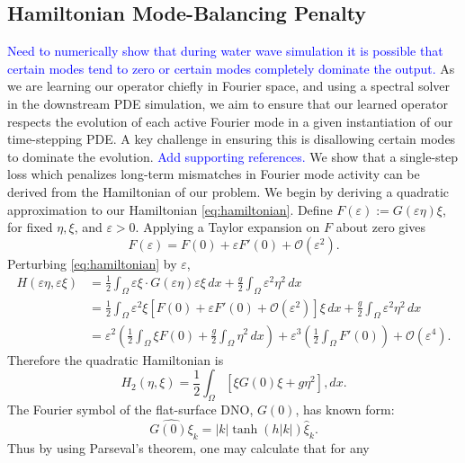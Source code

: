 \documentclass{article}
\begin{document}
\subsection{Hamiltonian Mode-Balancing Penalty}
\textcolor{blue}{Need to numerically show that during water wave simulation
it is possible that certain modes tend to zero or certain modes completely
dominate the output.}
As we are learning our operator chiefly in Fourier space, and using a
spectral solver in the downstream PDE simulation, we aim to ensure that
our learned operator respects the evolution of each active Fourier mode in
a given instantiation of our time-stepping PDE. A key challenge in ensuring
this is disallowing certain modes to dominate the evolution.
\textcolor{blue}{Add supporting references.}
We show that a single-step loss which penalizes long-term mismatches in
Fourier mode activity can be derived from the Hamiltonian of our problem.
We begin by deriving a quadratic approximation to our Hamiltonian
\eqref{eq:hamiltonian}. Define $F(\varepsilon):=G(\varepsilon\eta)\xi$,
for fixed $\eta,\xi$, and $\varepsilon>0$. Applying a Taylor expansion on
$F$ about zero gives
\begin{equation}
    F(\varepsilon)=F(0)+\varepsilon F'(0)+\mathcal O(\varepsilon^2).
\end{equation}
Perturbing \eqref{eq:hamiltonian} by $\varepsilon$,
\begin{align}
    H(\varepsilon\eta,\varepsilon\xi)
    &=\frac12\int_\Omega\varepsilon\xi\cdot
        G(\varepsilon\eta)\varepsilon\xi\,dx
      +\frac g2\int_\Omega\varepsilon^2\eta^2\,dx\\
    &=\frac12\int_\Omega\varepsilon^2\xi
      [F(0)+\varepsilon F'(0)+\mathcal O(\varepsilon^2)]\xi\,dx
      +\frac g2\int_\Omega\varepsilon^2\eta^2\,dx\\
    &=\varepsilon^2\left(\frac12\int_\Omega\xi F(0)
        +\frac g2\int_\Omega\eta^2\,dx\right)
      +\varepsilon^3\left(\frac12\int_\Omega F'(0)\right)
      +\mathcal O(\varepsilon^4).
\end{align}
Therefore the quadratic Hamiltonian is
\begin{equation}
    H_2(\eta,\xi)=\frac12\int_\Omega[\xi G(0)\xi+g\eta^2],dx.
    \label{eq:quadratic-H}
\end{equation}
The Fourier symbol of the flat-surface DNO, $G(0)$, has known form:
\begin{equation}
    \widehat{G(0)\xi}_k=|k|\tanh(h|k|)\widehat\xi_k.
\end{equation}
Thus by using Parseval's theorem, one may calculate that for any
\end{document}

